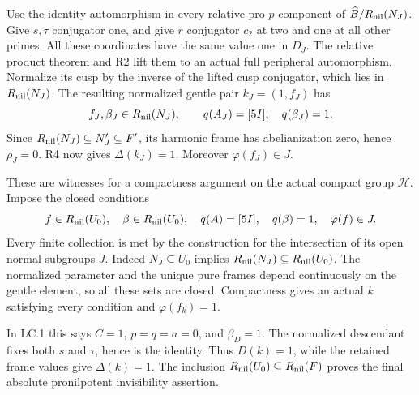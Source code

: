 Use the identity automorphism in every relative pro-$p$ component
of $\widehat B/R_{\rm nil}(N_J)$. Give $s,\tau$ conjugator one,
and give $r$ conjugator $c_2$ at two and one at all other primes.
All these coordinates have the same value one in $D_J$.
The relative product theorem and R2 lift them to an actual full
peripheral automorphism. Normalize its cusp by the inverse of
the lifted cusp conjugator, which lies in $R_{\rm nil}(N_J)$.
The resulting normalized gentle pair $k_J=(1,f_J)$ has
\[
 f_J,\beta_J\in R_{\rm nil}(N_J),\qquad
 q(A_J)=[5I],\quad q(\beta_J)=1.
\]
Since $R_{\rm nil}(N_J)\subseteq N_J'\subseteq F'$, its
harmonic frame has abelianization zero, hence $\rho_J=0$.
R4 now gives $\Delta(k_J)=1$. Moreover
$\varphi(f_J)\in J$.

These are witnesses for a compactness argument on the actual
compact group $\mathcal H$. Impose the closed conditions
\[
 f\in R_{\rm nil}(U_0),\quad\beta\in R_{\rm nil}(U_0),
 \quad q(A)=[5I],\quad q(\beta)=1,
 \quad\varphi(f)\in J.
\]
Every finite collection is met by the construction for the
intersection of its open normal subgroups $J$.
Indeed $N_J\subseteq U_0$ implies
$R_{\rm nil}(N_J)\subseteq R_{\rm nil}(U_0)$.
The normalized parameter and the unique pure frames depend
continuously on the gentle element, so all these sets are closed.
Compactness gives an actual $k$ satisfying every condition and
$\varphi(f_k)=1$.

In LC.1 this says $C=1$, $p=q=a=0$, and $\beta_D=1$.
The normalized descendant fixes both $s$ and $\tau$, hence is
the identity. Thus $D(k)=1$, while the retained frame values
give $\Delta(k)=1$. The inclusion
$R_{\rm nil}(U_0)\subseteq R_{\rm nil}(F)$ proves the final
absolute pronilpotent invisibility assertion.

